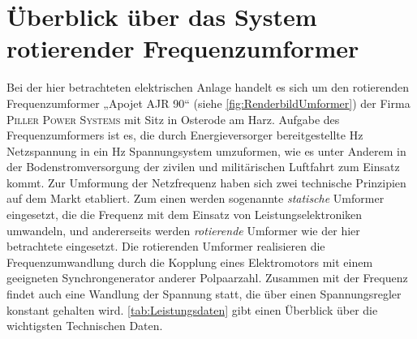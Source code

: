 \section{Überblick über das System rotierender Frequenzumformer}
\label{sec:Uberblick}
Bei der hier betrachteten elektrischen Anlage handelt es sich um den rotierenden Frequenzumformer „Apojet AJR 90“ (siehe \cref{fig:RenderbildUmformer}) der Firma \textsc{Piller Power Systems} mit Sitz in Osterode am Harz. Aufgabe des Frequenzumformers ist es, die durch Energieversorger bereitgestellte \unit[50]{Hz} Netzspannung in ein \unit[400]{Hz} Spannungsystem umzuformen, wie es unter Anderem in der Bodenstromversorgung der zivilen und militärischen Luftfahrt zum Einsatz kommt.
Zur Umformung der Netzfrequenz haben sich zwei technische Prinzipien auf dem Markt etabliert. Zum einen werden sogenannte \emph{statische} Umformer eingesetzt, die die Frequenz mit dem Einsatz von Leistungselektroniken umwandeln, und andererseits werden \emph{rotierende} Umformer wie der hier betrachtete eingesetzt. Die rotierenden Umformer realisieren die Frequenzumwandlung durch die Kopplung eines Elektromotors mit einem geeigneten Synchrongenerator anderer Polpaarzahl. Zusammen mit der Frequenz findet auch eine Wandlung der Spannung statt, die über einen Spannungsregler konstant gehalten wird. \cref{tab:Leistungsdaten} gibt einen Überblick über die wichtigsten Technischen Daten.

